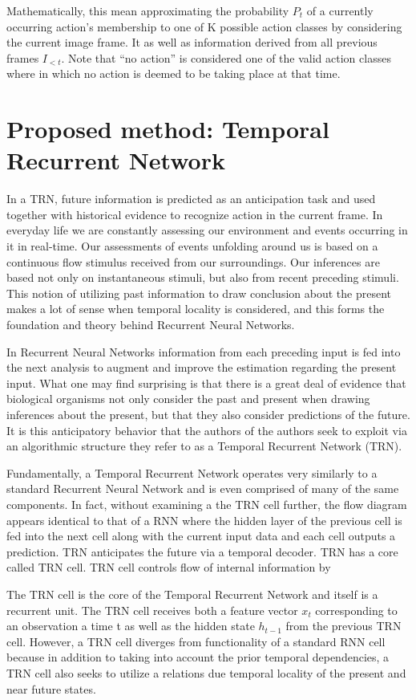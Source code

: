 \documentclass{article}
\begin{document}
    Mathematically, this mean approximating the probability $P_t$ of a currently occurring action’s membership to one of K possible action classes by considering the current image frame. It as well as information derived from all previous frames $I_{<t}$. Note that “no action” is considered one of the valid action classes where in which no action is deemed to be taking place at that time.

\section{Proposed method: Temporal Recurrent Network}
    In a TRN, future information is predicted as an anticipation task and used together with historical evidence to recognize action in the current frame. In everyday life we are constantly assessing our environment and events occurring in it in real-time. Our assessments of events unfolding around us is based on a continuous flow stimulus received from our surroundings. Our inferences are based not only on instantaneous stimuli, but also from recent preceding stimuli. This notion of utilizing past information to draw conclusion about the present makes a lot of sense when temporal locality is considered, and this forms the foundation and theory behind Recurrent Neural Networks.
    
    In Recurrent Neural Networks information from each preceding input is fed into the next analysis to augment and improve the estimation regarding the present input. What one may find surprising is that there is a great deal of evidence that biological organisms not only consider the past and present when drawing inferences about the present, but that they also consider predictions of the future. It is this anticipatory behavior that the authors of the authors seek to exploit via an algorithmic structure they refer to as a Temporal Recurrent Network (TRN).
    
    Fundamentally, a Temporal Recurrent Network operates very similarly to a standard Recurrent Neural Network and is even comprised of many of the same components. In fact, without examining a the TRN cell further, the flow diagram appears identical to that of a RNN where the hidden layer of the previous cell is fed into the next cell along with the current input data and each cell outputs a prediction. 
    TRN anticipates the future via a temporal decoder. TRN has a core called TRN cell. TRN cell controls flow of internal information by 
    
    The TRN cell is the core of the Temporal Recurrent Network and itself is a recurrent unit. The TRN cell receives both a feature vector $x_t$ corresponding to an observation a time t as well as the hidden state $h_{t-1}$ from the previous TRN cell. However, a TRN cell diverges from functionality of a standard RNN cell because in addition to taking into account the prior temporal dependencies, a TRN cell also seeks to utilize a relations due temporal locality of the present and near future states.
    
\end{document}
